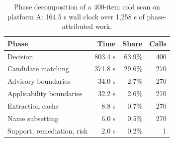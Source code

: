 \begin{table}[htbp]
\centering
\caption{Phase decomposition of a 400-item cold scan on platform A: 164.5 s wall clock over 1,258 s of phase-attributed work.}
\label{tab:phase}
\footnotesize
\begin{tabular}{l r r r}
\hline
Phase & Time & Share & Calls \\
\hline
Decision & 803.4 s & 63.9\% & 400 \\
Candidate matching & 371.8 s & 29.6\% & 270 \\
Advisory boundaries & 34.0 s & 2.7\% & 270 \\
Applicability boundaries & 32.2 s & 2.6\% & 270 \\
Extraction cache & 8.8 s & 0.7\% & 270 \\
Name subsetting & 6.0 s & 0.5\% & 270 \\
Support, remediation, risk & 2.0 s & 0.2\% & 1 \\
\hline
\end{tabular}
\end{table}
